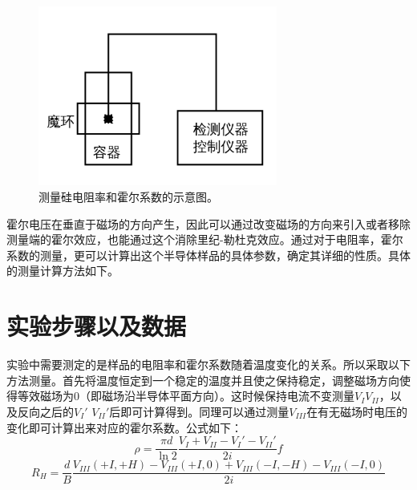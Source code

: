 \documentclass[aps,pre,12pt,preprint,onecolumn,showpacs,showkeys,UTF8]{revtex4-1}
\begin{document}
\begin{figure}[h]
	\begin{center}
		\includegraphics[width=0.7\textwidth]{pic1.png}
		\caption{\label{g:1}测量硅电阻率和霍尔系数的示意图。}
	\end{center}
\end{figure}

霍尔电压在垂直于磁场的方向产生，因此可以通过改变磁场的方向来引入或者移除测量端的霍尔效应，也能通过这个消除里纪-勒杜克效应。通过对于电阻率，霍尔系数的测量，更可以计算出这个半导体样品的具体参数，确定其详细的性质。具体的测量计算方法如下。
\section{实验步骤以及数据}
实验中需要测定的是样品的电阻率和霍尔系数随着温度变化的关系。所以采取以下方法测量。首先将温度恒定到一个稳定的温度并且使之保持稳定，调整磁场方向使得等效磁场为0（即磁场沿半导体平面方向）。这时候保持电流不变测量$V_I$$V_{II}$，以及反向之后的$V_I'$ $V_{II}'$后即可计算得到。同理可以通过测量$V_{III}$在有无磁场时电压的变化即可计算出来对应的霍尔系数。公式如下：
\begin{equation}
	\rho=\frac{\pi d}{\ln 2} \frac{V_I+V_{II}-V_I'-V_{II}'}{2i}f
\end{equation}
\begin{equation}
	R_H=\frac{d}{B}\frac{V_{III}(+I,+H)-V_{III}(+I,0)+V_{III}(-I,-H)-V_{III}(-I,0)}{2i}
\end{equation}
\end{document}
